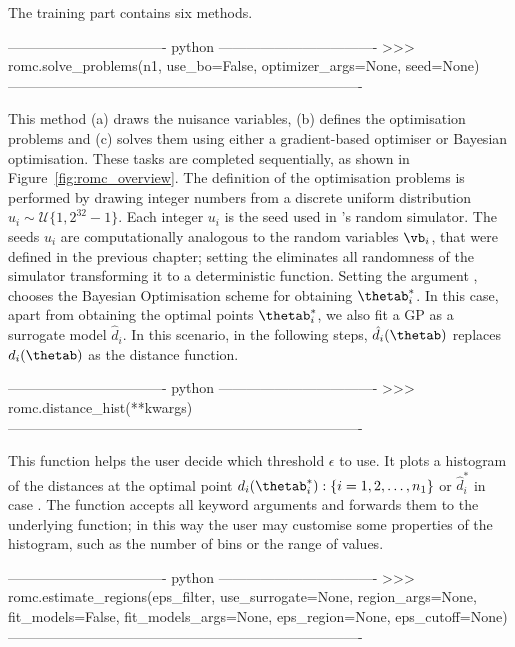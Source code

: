 The training part contains six methods.

\begin{Code}
---------------------------------- python ----------------------------------
>>> romc.solve_problems(n1,
                        use_bo=False,
                        optimizer_args=None,
                        seed=None)
----------------------------------------------------------------------------                    
\end{Code}

\noindent
This method (a) draws the nuisance variables, (b) defines the
optimisation problems and (c) solves them using either a
gradient-based optimiser or Bayesian optimisation. These tasks are
completed sequentially, as shown in Figure~\ref{fig:romc_overview}. The
definition of the optimisation problems is performed by drawing
 integer numbers from a discrete uniform distribution
$u_i \sim \mathcal{U}\{1, 2^{32}-1\}$. Each integer $u_i$ is the seed
used in 's random simulator. The seeds $u_i$ are
computationally analogous to the random variables $\vb_i$, that were
defined in the previous chapter; setting the  eliminates all randomness of the simulator transforming it to a deterministic
function. Setting the argument , chooses the
Bayesian Optimisation scheme for obtaining $\thetab_i^*$. In this
case, apart from obtaining the optimal points $\thetab_i^*$, we also
fit a GP as a surrogate model $\hat{d}_i$. In this
scenario, in the following steps, $\hat{d}_i(\thetab)$ replaces
$d_i(\thetab)$ as the distance function.

\begin{Code}
---------------------------------- python ----------------------------------
>>> romc.distance_hist(**kwargs)
----------------------------------------------------------------------------  
\end{Code}

\noindent
This function helps the user decide which threshold $\epsilon$ to
use. It plots a histogram of the distances at the optimal point
$d_i(\thetab_i^*) : \{i = 1, 2, \ldots, n_1\}$ or $\hat{d}_i^*$ in case
. The function accepts all keyword arguments and
forwards them to the underlying  function; in
this way the user may customise some properties of the histogram, such
as the number of bins or the range of values.

\begin{Code}
---------------------------------- python ----------------------------------  
>>> romc.estimate_regions(eps_filter,
                          use_surrogate=None,
                          region_args=None,
                          fit_models=False,
                          fit_models_args=None,
                          eps_region=None,
                          eps_cutoff=None)
----------------------------------------------------------------------------
\end{Code}

